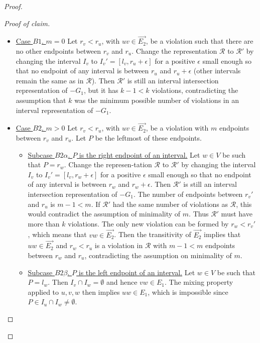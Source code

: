 \begin{proof}
\begin{proof}[Proof of claim]
		\begin{itemize}[]
			\item \underline{Case $B1$. $m = 0$} Let $r_v < r_u$, with $uv \in \overrightarrow{E_2}$, be a violation such that there are no other endpoints between $r_v$ and $r_u$. Change the representation $\mathcal{R}$ to $\mathcal{R}'$ by changing the interval $I_v$ to $I_v' = [l_v , r_u + \epsilon]$ for a positive $\epsilon$ small enough so that no endpoint of any interval is between $r_u$ and $r_u + \epsilon$ (other intervals remain the same as in $\mathcal{R}$). Then $\mathcal{R}'$ is still an interval intersection representation of $-G_1$, but it has $k - 1 < k$ violations, contradicting the assumption that $k$ was the minimum possible number of violations in an interval representation of $-G_1$.
			
			\item \underline{Case $B2$. $m > 0$} Let $r_v < r_u$, with $uv \in \overrightarrow{E_2}$, be a violation with $m$ endpoints between $r_v$ and $r_u$. Let $P$ be the leftmost of these endpoints.
			
			\begin{itemize}[]
				\item \underline{Subcase $B2\alpha$. $P$ is the right endpoint of an interval.} Let $w \in V$ be such that $P = r_w$. Change the represen-\newline tation $\mathcal{R}$ to $\mathcal{R}'$ by changing the interval $I_v$ to $I_v' = [l_v , r_w + \epsilon]$ for a positive $\epsilon$ small enough so that no endpoint of any interval is between $r_w$ and $r_w + \epsilon$. Then $\mathcal{R}'$ is still an interval intersection representation of $-G_1$. The number of endpoints between $r_v'$ and $r_u$ is $m - 1 < m$. If $\mathcal{R}'$ had the same number of violations as $\mathcal{R}$, this would contradict the assumption of minimality of $m$. Thus $\mathcal{R}'$ must have more than $k$ violations. The only new violation can be formed by $r_w < r_v'$, which means that $vw \in \overrightarrow{E_2}$. Then the transitivity of $\overrightarrow{E_2}$ implies that $uw \in \overrightarrow{E_2}$ and $r_w < r_u$ is a violation in $\mathcal{R}$ with $m - 1 < m$ endpoints between $r_w$ and $r_u$, contradicting the assumption on minimality of $m$.
				
				\item \underline{Subcase $B2\beta$. $P$ is the left endpoint of an interval.} Let $w \in V$ be such that $P = l_w$. Then $I_v \cap I_w = \emptyset$ and hence $vw \in E_1$. The mixing property applied to $u, v, w$ then implies $uw \in E_1$, which is impossible since $P \in I_u \cap I_w \neq \emptyset$.
			\end{itemize}
		\end{itemize}
		

\end{proof}
\end{proof}
